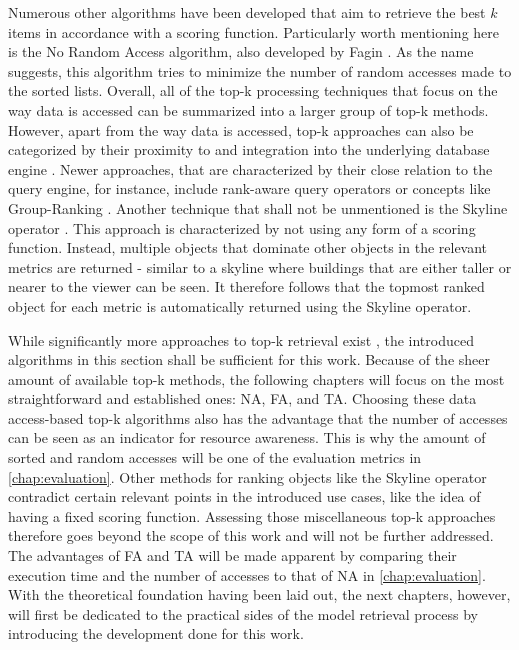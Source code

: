 Numerous other algorithms have been developed that aim to retrieve the best $k$ items in accordance with a scoring function. Particularly worth mentioning here is the No Random Access algorithm, also developed by Fagin \cite{fagin2002a}. As the name suggests, this algorithm tries to minimize the number of random accesses made to the sorted lists. Overall, all of the top-k processing techniques that focus on the way data is accessed can be summarized into a larger group of top-k methods. However, apart from the way data is accessed, top-k approaches can also be categorized by their proximity to and integration into the underlying database engine \cite{ilyas2008}. Newer approaches, that are characterized by their close relation to the query engine, for instance, include rank-aware query operators or concepts like Group-Ranking \cite{li2006}. Another technique that shall not be unmentioned is the Skyline operator \cite{borzsony2001}. This approach is characterized by not using any form of a scoring function. Instead, multiple objects that dominate other objects in the relevant metrics are returned - similar to a skyline where buildings that are either taller or nearer to the viewer can be seen. It therefore follows that the topmost ranked object for each metric is automatically returned using the Skyline operator. 

While significantly more approaches to top-k retrieval exist \cite{ilyas2008}, the introduced algorithms in this section shall be sufficient for this work. Because of the sheer amount of available top-k methods, the following chapters will focus on the most straightforward and established ones: NA, FA, and TA. Choosing these data access-based top-k algorithms also has the advantage that the number of accesses can be seen as an indicator for resource awareness. This is why the amount of sorted and random accesses will be one of the evaluation metrics in \autoref{chap:evaluation}. Other methods for ranking objects like the Skyline operator contradict certain relevant points in the introduced use cases, like the idea of having a fixed scoring function. Assessing those miscellaneous top-k approaches therefore goes beyond the scope of this work and will not be further addressed. The advantages of FA and TA will be made apparent by comparing their execution time and the number of accesses to that of NA in \autoref{chap:evaluation}.
With the theoretical foundation having been laid out, the next chapters, however, will first be dedicated to the practical sides of the model retrieval process by introducing the development done for this work.